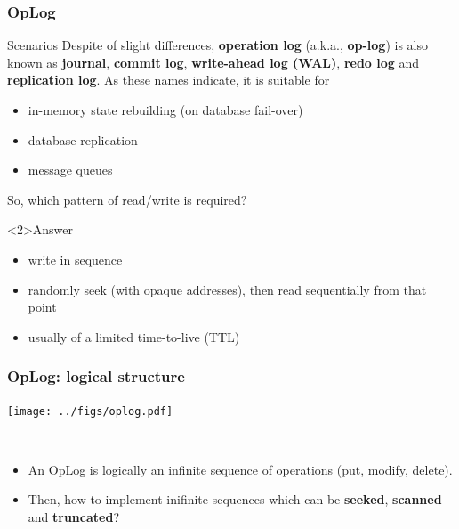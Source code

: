 \documentclass[lualatex]{beamer}
\renewcommand{\emph}{\textbf}
\begin{document}
\begin{frame}
  \frametitle{OpLog}

  \begin{block}{Scenarios}
    Despite of slight differences,
    \emph{operation log} (a.k.a., \emph{op-log}) is also known as
    \emph{journal}, \emph{commit log}, \emph{write-ahead log (WAL)},
    \emph{redo log} and \emph{replication log}.
    As these names indicate, it is suitable for
    \begin{itemize}
      \item in-memory state rebuilding (on database fail-over)
      \item database replication
      \item message queues
    \end{itemize}
    So, which pattern of read/write is required?
  \end{block}
  \begin{exampleblock}<2>{Answer}
    \begin{itemize}
      \item write in sequence
      \item randomly seek (with opaque addresses), then read sequentially from that point
      \item usually of a limited time-to-live (TTL)
    \end{itemize}
  \end{exampleblock}
\end{frame}

\begin{frame}
  \frametitle{OpLog: logical structure}
  \begin{center}
    \texttt{[image: ../figs/oplog.pdf]}
  \end{center}
  \begin{block}{~}
    \begin{itemize}
      \item An OpLog is logically an infinite sequence of operations (put, modify, delete).
      \item Then, how to implement inifinite sequences which can be \emph{seeked}, \emph{scanned} and \emph{truncated}?
    \end{itemize}
  \end{block}
\end{frame}
\end{document}
